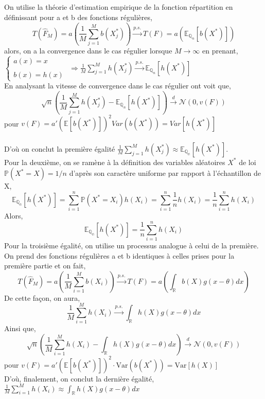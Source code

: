 \documentclass{article}
\newcommand{\mean}{\mathbb{E}}
\newcommand{\var}{\mathrm{Var}}
\begin{document}
\subsection{}
On utilise la théorie d'estimation empirique de la fonction répartition en définissant pour a et b des fonctions régulières,
$$T(\hat F_{M})=a\left(\frac{1}{M}\sum_{j=1}^{M}b(X_{j}^{*})\right)\overset{p.s.}{\longrightarrow}T(F)=a\left(\mean_{\mathbb{Q}_{n}} [b(X^{*})]\right)$$
alors, on a la convergence dans le cas régulier lorsque $\displaystyle M\to \infty$ en prenant,
\\

$ \left\{
\begin{array}{ll}
\displaystyle a(x)=x \\ \\
\displaystyle b(x)=h(x)
\end{array}
\right.
$
$\Longrightarrow \frac{1}{M}\sum_{j=1}^{M}h(X_{j}^{*})\overset{p.s.}{\longrightarrow}\mean_{\mathbb{Q}_n} [h(X^{*})]$
\vspace{0.5 cm}
\\
En analysant la vitesse de convergence dans le cas régulier ont voit que,
$$\sqrt{n}\left(\frac{1}{M}\sum_{j=1}^{M}h(X_{j}^{*})-\mean_{\mathbb{Q}_{n}} [h(X^{*})]\right)\overset{d}{\longrightarrow}\mathcal{N}(0,v(F))$$
pour $\displaystyle v(F)=a'(\mean[b(X^{*})])^2Var(b(X^{*}))=Var[h(X^{*})]$ \\ \\
D'où on conclut la première égalité $\displaystyle \frac{1}{M}\sum_{j=1}^{M}h(X_{j}^{*}) \approx \mean_{\mathbb{Q_{n}}} [h(X^{*})]$.
\\
Pour la deuxième, on se ramène à la définition des variables aléatoires $\displaystyle X^*$ de loi $\displaystyle \mathbb{P}(X^*=X)=1/n$ d'après son caractère uniforme par rapport à l'échantillon de X,
$$\mean_{\mathbb{Q_{n}}} [h(X^{*})]=\sum_{i=1}^{n}\mathbb{P}(X^*=X_i)h(X_i)=\sum_{i=1}^{n}\frac{1}{n}h(X_i)=\frac{1}{n}\sum_{i=1}^{n}h(X_i)$$
Alors,
$$\mean_{\mathbb{Q_{n}}} [h(X^{*})]=\frac{1}{n}\sum_{i=1}^{n}h(X_i)$$
Pour la troisième égalité, on utilise un processus analogue à celui de la première. On prend des fonctions régulières a et b identiques à celles prises pour la première partie et on fait,
$$T(\hat F_{M})=a\left(\frac{1}{M}\sum_{i=1}^{M}b(X_{i})\right)\overset{p.s.}{\longrightarrow}T(F)=a\left(\int_{\mathbb{R}} b(X)g(x-\theta)dx\right)$$
De cette façon, on aura,
$$ \frac{1}{M}\sum_{i=1}^{M}h(X_{i})\overset{p.s.}{\longrightarrow}\int_{\mathbb{R}} h(X)g(x-\theta)dx$$
Ainsi que,
$$\sqrt{n}\left(\frac{1}{M}\sum_{i=1}^{M}h(X_{i})-\int_{\mathbb{R}} h(X)g(x-\theta)dx\right)\overset{d}{\longrightarrow}\mathcal{N}(0,v(F))$$
pour $\displaystyle v(F)=a'(\mean[b(X^{*})])^2\cdot\var(b(X^{*}))=\var[h(X)]$
\vspace{0.5cm} \\
D'où, finalement, on conclut la dernière égalité,
\\ $\displaystyle \frac{1}{M}\sum_{i=1}^{M}h(X_{i}) \approx \int_{\mathbb{R}} h(X)g(x-\theta)dx$
\vspace{1 cm}
\end{document}
